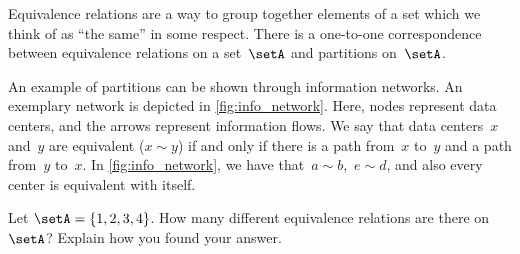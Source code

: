 \begin{remark}
    Equivalence relations are a way to group together elements of a set which we think of as ``the same'' in some respect.
    There is a one-to-one correspondence between equivalence relations on a set~$\setA$ and partitions on~$\setA$.
\end{remark}


\begin{marginfigure}
    \centering
    \caption{
        \label{fig:info_network}
    }
\end{marginfigure}

\begin{example}
    An example of partitions can be shown through information networks.
    An exemplary network is depicted in \cref{fig:info_network}.
    Here, nodes represent data centers, and the arrows represent information flows.
    We say that data centers~$x$ and~$y$ are equivalent ($x\sim y$) if and only if there is a path from~$x$ to~$y$ and a path from~$y$ to~$x$.
    In \cref{fig:info_network}, we have that~$a\sim b$,~$e\sim d$, and also every center is equivalent with itself.
\end{example}


\begin{gradedexercise}
    \label{ex:CountingEquivalenceRelations}
    Let $\setA = \{ 1, 2, 3, 4 \}$.
    How many different equivalence relations are there on $\setA$?
    Explain how you found your answer.
\end{gradedexercise}


